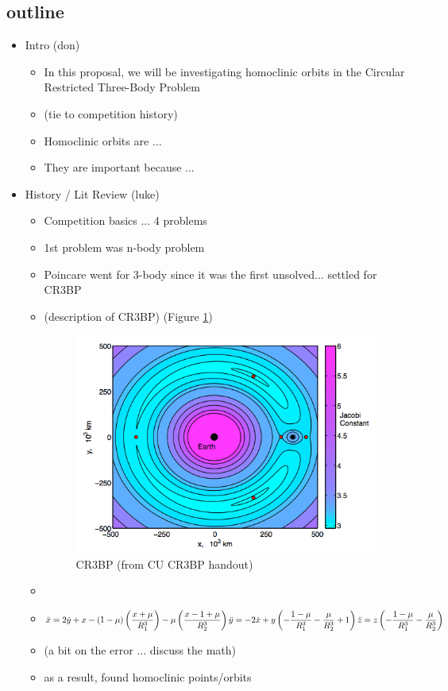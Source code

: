 \documentclass{article}
\begin{document}
\subsection{outline}
\begin{itemize}
	\item Intro (don)
	  \begin{itemize}
	  	\item In this proposal, we will be investigating homoclinic orbits in the Circular Restricted Three-Body Problem
	  	\item (tie to competition history)
	  	\item Homoclinic orbits are ... 
	  	\item They are important because ...
	  \end{itemize}
	\item History / Lit Review (luke)
	  \begin{itemize}
	  	\item Competition basics ... 4 problems
	  	\item 1st problem was n-body problem
	  	\item Poincare went for 3-body since it was the first unsolved... settled for CR3BP 
	  	\item (description of CR3BP) (Figure \ref{fig:CR3BP_EarthMoon})
			\begin{figure}
			\centering
			\includegraphics[scale=0.7]{CR3BP_EarthMoon.png}
			\caption{CR3BP (from CU CR3BP handout)}
			\label{fig:CR3BP_EarthMoon}
			\end{figure}
		\item
	  	\item $\ddot{x} =  2\dot{y} + x - (1-\mu)\left(\dfrac{x+\mu}{R_1^3}\right) - \mu\left(\dfrac{x-1+\mu}{R_2^3}\right)\\
		\ddot{y} = - 2\dot{x} + y\left(-\dfrac{1-\mu}{R_1^3} - \dfrac{\mu}{R_2^3} + 1\right) \\
		\ddot{z} = z\left(-\dfrac{1 - \mu}{R_1^3} - \dfrac{\mu}{R_2^3}\right)$
	  	\item (a bit on the error ... discuss the math)
	  	\item as a result, found homoclinic points/orbits


\end{itemize}
\end{itemize}
\end{document}
